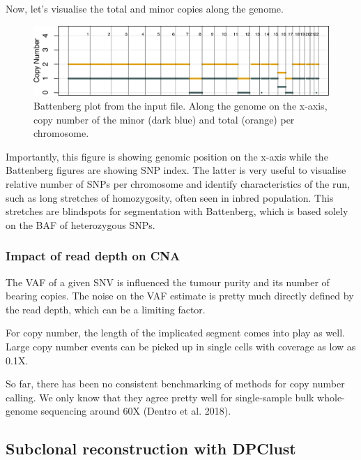 \documentclass[]{article}
\begin{document}
Now, let's visualise the total and minor copies along the genome.

\begin{figure}

{\centering \includegraphics{src_guide_files/figure-latex/fig2-1} 

}

\caption{\label{fig2} Battenberg plot from the input file. Along the genome on the x-axis, copy number of the minor (dark blue) and total (orange) per chromosome. }\label{fig:fig2}
\end{figure}

Importantly, this figure is showing genomic position on the x-axis while
the Battenberg figures are showing SNP index. The latter is very useful
to visualise relative number of SNPs per chromosome and identify
characteristics of the run, such as long stretches of homozygosity,
often seen in inbred population. This stretches are blindspots for
segmentation with Battenberg, which is based solely on the BAF of
heterozygous SNPs.

\hypertarget{impact-of-read-depth-on-cna}{%
\subsubsection{Impact of read depth on
CNA}\label{impact-of-read-depth-on-cna}}

The VAF of a given SNV is influenced the tumour purity and its number of
bearing copies. The noise on the VAF estimate is pretty much directly
defined by the read depth, which can be a limiting factor.

For copy number, the length of the implicated segment comes into play as
well. Large copy number events can be picked up in single cells with
coverage as low as 0.1X.

So far, there has been no consistent benchmarking of methods for copy
number calling. We only know that they agree pretty well for
single-sample bulk whole-genome sequencing around 60X (Dentro et al.
2018).

\newpage

\hypertarget{subclonal-reconstruction-with-dpclust}{%
\subsection{Subclonal reconstruction with
DPClust}\label{subclonal-reconstruction-with-dpclust}}
\end{document}
